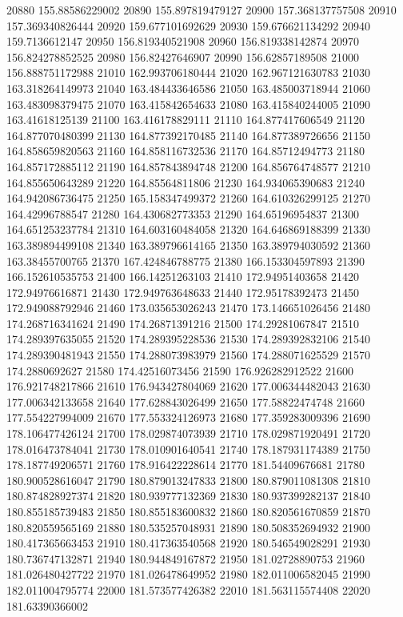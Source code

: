 {20880 155.88586229002
20890 155.897819479127
20900 157.368137757508
20910 157.369340826444
20920 159.677101692629
20930 159.676621134292
20940 159.7136612147
20950 156.819340521908
20960 156.819338142874
20970 156.824278852525
20980 156.82427646907
20990 156.62857189508
21000 156.888751172988
21010 162.993706180444
21020 162.967121630783
21030 163.318264149973
21040 163.484433646586
21050 163.485003718944
21060 163.483098379475
21070 163.415842654633
21080 163.415840244005
21090 163.41618125139
21100 163.416178829111
21110 164.877417606549
21120 164.877070480399
21130 164.877392170485
21140 164.877389726656
21150 164.858659820563
21160 164.858116732536
21170 164.85712494773
21180 164.857172885112
21190 164.857843894748
21200 164.856764748577
21210 164.855650643289
21220 164.85564811806
21230 164.934065390683
21240 164.942086736475
21250 165.158347499372
21260 164.610326299125
21270 164.42996788547
21280 164.430682773353
21290 164.65196954837
21300 164.651253237784
21310 164.603160484058
21320 164.646869188399
21330 163.389894499108
21340 163.389796614165
21350 163.389794030592
21360 163.38455700765
21370 167.424846788775
21380 166.153304597893
21390 166.152610535753
21400 166.14251263103
21410 172.94951403658
21420 172.94976616871
21430 172.949763648633
21440 172.95178392473
21450 172.949088792946
21460 173.035653026243
21470 173.146651026456
21480 174.268716341624
21490 174.26871391216
21500 174.29281067847
21510 174.289397635055
21520 174.289395228536
21530 174.289392832106
21540 174.289390481943
21550 174.288073983979
21560 174.288071625529
21570 174.2880692627
21580 174.42516073456
21590 176.926282912522
21600 176.921748217866
21610 176.943427804069
21620 177.006344482043
21630 177.006342133658
21640 177.628843026499
21650 177.58822474748
21660 177.554227994009
21670 177.553324126973
21680 177.359283009396
21690 178.106477426124
21700 178.029874073939
21710 178.029871920491
21720 178.016473784041
21730 178.010901640541
21740 178.187931174389
21750 178.187749206571
21760 178.916422228614
21770 181.54409676681
21780 180.900528616047
21790 180.879013247833
21800 180.879011081308
21810 180.874828927374
21820 180.939777132369
21830 180.937399282137
21840 180.855185739483
21850 180.855183600832
21860 180.820561670859
21870 180.820559565169
21880 180.535257048931
21890 180.508352694932
21900 180.417365663453
21910 180.417363540568
21920 180.546549028291
21930 180.736747132871
21940 180.944849167872
21950 181.02728890753
21960 181.026480427722
21970 181.026478649952
21980 182.011006582045
21990 182.011004795774
22000 181.573577426382
22010 181.563115574408
22020 181.63390366002
}
